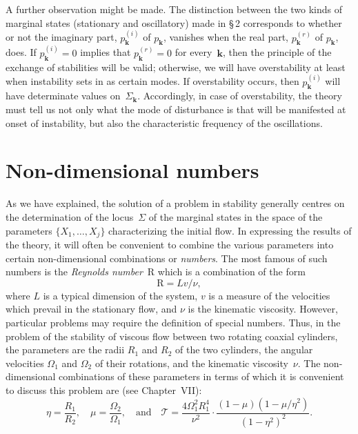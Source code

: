 A further observation might be made.  The distinction between the
two kinds of marginal states (stationary and oscillatory) made in \S\,2
corresponds to whether or not the imaginary part, $p_{\mathbf{k}}^{(i)}$ of $p_{\mathbf{k}}$, vanishes
when the real part, $p_{\mathbf{k}}^{(r)}$ of $p_{\mathbf{k}}$, does.  If $p_{\mathbf{k}}^{(i)} = 0$ implies that $p_{\mathbf{k}}^{(r)} = 0$ for
every~$\mathbf{k}$, then the principle of the exchange of stabilities will be valid;
otherwise, we will have overstability at least when instability sets in as
certain modes.  If overstability occurs, then $p_{\mathbf{k}}^{(i)}$ will have determinate
values on~$\Sigma_{\mathbf{k}}$.  Accordingly, in case of overstability, the theory must tell
us not only what the mode of disturbance is that will be manifested at
onset of instability, but also the characteristic frequency of the oscillations.

\section{Non-dimensional numbers}
\label{sec:1-4}

As we have explained, the solution of a problem in stability generally
centres on the determination of the locus~$\Sigma$ of the marginal states in the
space of the parameters $\{X_1, \ldots, X_j\}$ characterizing the initial flow.  In
expressing the results of the theory, it will often be convenient to combine
the various parameters into certain non-dimensional combinations or
\emph{numbers}.  The most famous of such numbers is the \emph{Reynolds number}~$\mathrm{R}$
which is a combination of the form
\begin{equation}
\label{eq:1-11}
\mathrm{R} = Lv/\nu,
\end{equation}
where $L$ is a typical dimension of the system, $v$ is a measure of the
velocities which prevail in the stationary flow, and $\nu$ is the kinematic
viscosity.  However, particular problems may require the definition of
special numbers.  Thus, in the problem of the stability of viscous flow
between two rotating coaxial cylinders, the parameters are the radii
$R_1$ and $R_2$ of the two cylinders, the angular velocities $\Omega_1$ and $\Omega_2$ of their
rotations, and the kinematic viscosity~$\nu$.  The non-dimensional combinations of these parameters in terms of which it is convenient to discuss
this problem are (see Chapter~VII):
\begin{equation}
\label{eq:1-12}
\eta = \frac{R_1}{R_2},\quad \mu = \frac{\Omega_2}{\Omega_1},
\quad\text{and}\quad
\mathscr{T} = \frac{4\Omega_1^2 R_1^4}{\nu^2}
\cdot \frac{(1-\mu)(1-\mu/\eta^2)}{(1-\eta^2)^2}.
\end{equation}

